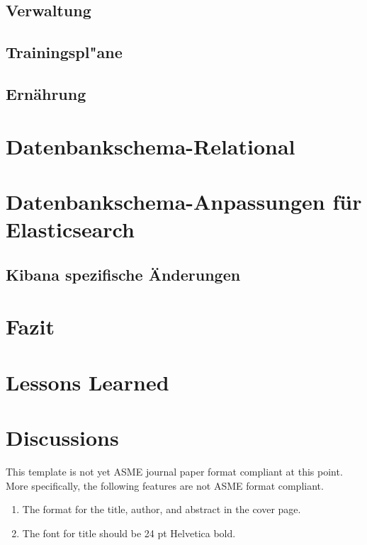\documentclass[twocolumn,10pt]{asme2ej}
\begin{document}
\subsection{Verwaltung}



\subsection{Trainingspl"ane}




\subsection{Ern\"ahrung}


\section{Datenbankschema-Relational}

\section{Datenbankschema-Anpassungen f\"ur Elasticsearch}

\subsection{Kibana spezifische \"Anderungen}


\section{Fazit}

\section{Lessons Learned}
\section{Discussions}
This template is not yet ASME journal paper format compliant at this point.
More specifically, the following features are not ASME format compliant.
\begin{enumerate}
\item
The format for the title, author, and abstract in the cover page.
\item
The font for title should be 24 pt Helvetica bold.
\end{enumerate}
\end{document}
